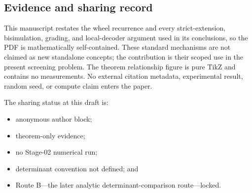 \subsection{Evidence and sharing record}

This manuscript restates the wheel recurrence and every strict-extension,
bisimulation, grading, and local-decoder argument used in its conclusions, so
the PDF is mathematically self-contained.  These standard mechanisms are not
claimed as new standalone concepts; the contribution is their scoped use in
the present screening problem.
The theorem relationship figure is pure TikZ and contains no measurements.
No external citation metadata, experimental result, random seed, or compute
claim enters the paper.

The sharing status at this draft is:
\begin{itemize}
  \item anonymous author block;
  \item theorem-only evidence;
  \item no Stage-02 numerical run;
  \item determinant convention not defined; and
  \item Route B---the later analytic determinant-comparison route---locked.
\end{itemize}
